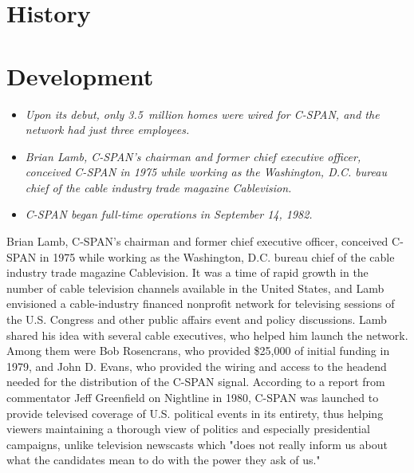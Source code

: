 \section{History}\label{history}

\section{Development}\label{development}

\begin{itemize}
\item
  \emph{Upon its debut, only 3.5~million homes were wired for C-SPAN,
  and the network had just three employees.}
\item
  \emph{Brian Lamb, C-SPAN's chairman and former chief executive
  officer, conceived C-SPAN in 1975 while working as the Washington,
  D.C. bureau chief of the cable industry trade magazine Cablevision.}
\item
  \emph{C-SPAN began full-time operations in September 14, 1982.}
\end{itemize}

Brian Lamb, C-SPAN's chairman and former chief executive officer,
conceived C-SPAN in 1975 while working as the Washington, D.C. bureau
chief of the cable industry trade magazine Cablevision. It was a time of
rapid growth in the number of cable television channels available in the
United States, and Lamb envisioned a cable-industry financed nonprofit
network for televising sessions of the U.S. Congress and other public
affairs event and policy discussions. Lamb shared his idea with several
cable executives, who helped him launch the network. Among them were Bob
Rosencrans, who provided \$25,000 of initial funding in 1979, and John
D. Evans, who provided the wiring and access to the headend needed for
the distribution of the C-SPAN signal. According to a report from
commentator Jeff Greenfield on Nightline in 1980, C-SPAN was launched to
provide televised coverage of U.S. political events in its entirety,
thus helping viewers maintaining a thorough view of politics and
especially presidential campaigns, unlike television newscasts which
"does not really inform us about what the candidates mean to do with the
power they ask of us."

